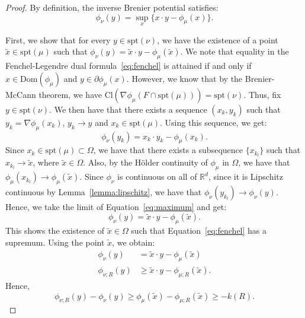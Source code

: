 \documentclass{amsart}
\theoremstyle{lemma}
\theoremstyle{remark}
\begin{document}
\begin{proof}
By definition, the inverse Brenier potential satisfies:
\begin{equation}\label{eq:fenchel}
\phi_{\nu}(y) = \sup_{x} \{ x \cdot y - \phi_{\mu}(x) \}.
\end{equation}

First, we show that for every $y \in \text{spt}(\nu)$, we have the existence of a point $\tilde{x} \in \text{spt}(\mu)$ such that $\phi_{\nu}(y) = \tilde{x} \cdot y - \phi_{\mu}(\tilde{x})$. We note that equality in the Fenchel-Legendre dual formula~\eqref{eq:fenchel} is attained if and only if $x \in \text{Dom}(\phi_{\mu})$ and $y \in \partial \phi_{\mu}(x)$. However, we know that by the Brenier-McCann theorem, we have $\text{Cl} (\nabla \phi_{\mu} (F \cap \text{spt}(\mu)))  = \text{spt}(\nu)$. Thus, fix $y \in \text{spt}(\nu)$. We then have that there exists a sequence $(x_k, y_k)$ such that $y_k = \nabla \phi_{\mu}(x_k)$, $y_k \rightarrow y$ and $x_k \in \text{spt}(\mu)$. Using this sequence, we get:
\begin{equation}\label{eq:maximum}
\phi_{\nu}(y_k) = x_k \cdot y_k - \phi_{\mu}(x_k).
\end{equation}
Since $x_k \in \text{spt}(\mu) \subset \Omega$, we have that there exists a subsequence $\{ x_{k_{l}} \}$ such that $x_{k_{l}} \rightarrow \tilde{x}$, where $\tilde{x} \in \Omega$. Also, by the H\"{o}lder continuity of $\phi_{\mu}$ in $\Omega$, we have that $\phi_{\mu}(x_{k_{l}}) \rightarrow \phi_{\mu}(\tilde{x})$. Since $\phi_{\nu}$ is continuous on all of $\mathbb{R}^d$, since it is Lipschitz continuous by Lemma~\ref{lemma:lipschitz}, we have that $\phi_{\nu}(y_{k_{l}}) \rightarrow \phi_{\nu}(y)$. Hence, we take the limit of Equation~\eqref{eq:maximum} and get:
\begin{equation}
\phi_{\nu}(y) = \tilde{x} \cdot y - \phi_{\mu}(\tilde{x}).
\end{equation}
This shows the existence of $\tilde{x} \in \Omega$ such that Equation~\eqref{eq:fenchel} has a supremum. Using the point $\tilde{x}$, we obtain:
\begin{align}
\phi_{\nu}(y) &= \tilde{x} \cdot y - \phi_{\mu}(\tilde{x}) \\
\phi_{\nu;R}(y) &\geq \tilde{x} \cdot y - \phi_{\mu;R}(\tilde{x}).
\end{align}
Hence,
\begin{equation}
\phi_{\nu;R}(y) - \phi_{\nu}(y) \geq \phi_{\mu}(\tilde{x}) - \phi_{\mu;R}(\tilde{x}) \geq -k(R).
\end{equation}

\end{proof}
\end{document}

